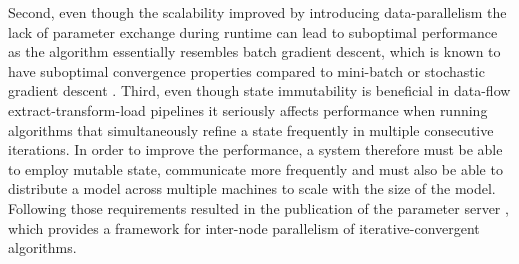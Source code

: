 Second, even though the scalability improved by introducing data-parallelism the lack of parameter exchange during runtime can lead to suboptimal performance \cite{xing2015strategies} as the algorithm essentially resembles batch gradient descent, which is known to have suboptimal convergence properties compared to mini-batch or stochastic gradient descent \cite{bottou2010large} \cite{smith2016cocoa}.
Third, even though state immutability is beneficial in data-flow extract-transform-load pipelines it seriously affects performance when running algorithms that simultaneously refine a state frequently in multiple consecutive iterations.
In order to improve the performance, a system therefore must be able to employ mutable state, communicate more frequently and must also be able to distribute a model across multiple machines to scale with the size of the model.
Following those requirements resulted in the publication of the parameter server \cite{Li2014}, which provides a framework for inter-node parallelism of iterative-convergent algorithms.

